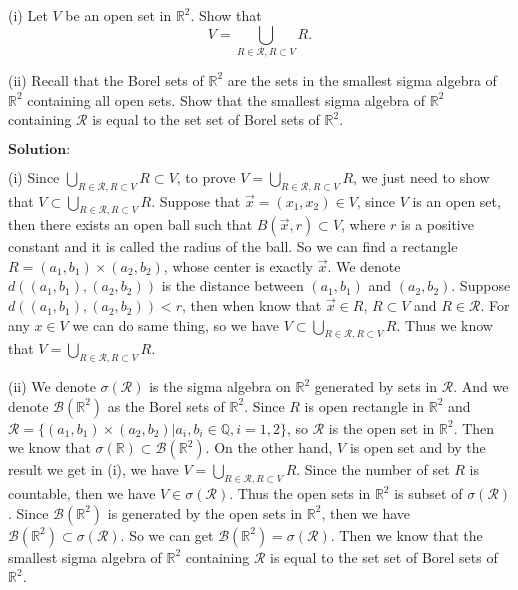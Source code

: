\documentclass[12pt,a4paper]{ctexart}
\begin{document}
(i) Let $V$ be an open set in $\mathbb{R}^{2}$. Show that 
\begin{equation*}
   V = \bigcup_{R \in \mathcal{R}, R \subset V} R.
\end{equation*}

(ii) Recall that the Borel sets of $\mathbb{R}^{2}$ are the sets in the smallest sigma algebra of $\mathbb{R}^{2}$ containing all open sets. Show that the smallest sigma algebra of $\mathbb{R}^{2}$ containing $\mathcal{R}$ is equal to the set set of Borel sets of $\mathbb{R}^{2}$. 

\vspace{8pt}
$\textbf{Solution:}$

(i) Since $\bigcup_{R \in \mathcal{R}, R \subset V} R \subset V$, to prove $V = \bigcup_{R \in \mathcal{R}, R \subset V} R$, we just need to show that $V \subset \bigcup_{R \in \mathcal{R}, R \subset V} R$. Suppose that $\vec{x} = (x_{1}, x_{2}) \in V$, since $V$ is an open set, then there exists an open ball such that $B(\vec{x}, r) \subset V$, where $r$ is a positive constant and it is called the radius of the ball. So we can find a rectangle $ R = (a_{1}, b_{1}) \times (a_{2}, b_{2})$, whose center is exactly $\vec{x}$. We denote $d((a_{1}, b_{1}), (a_{2}, b_{2}))$ is the distance between $(a_{1}, b_{1})$ and $(a_{2}, b_{2})$. Suppose $d((a_{1}, b_{1}), (a_{2}, b_{2})) < r$, then when know that $\vec{x} \in R$, $R \subset V$ and $R \in \mathcal{R}$. For any $x \in V$ we can do same thing, so we have $V \subset \bigcup_{R \in \mathcal{R}, R \subset V} R$. Thus we know that $V = \bigcup_{R \in \mathcal{R}, R \subset V} R$.

(ii) We denote $\sigma(\mathcal{R})$ is the sigma algebra on $\mathbb{R}^{2}$ generated by sets in $\mathcal{R}$. And we denote $\mathcal{B}(\mathbb{R}^{2})$ as the Borel sets of $\mathbb{R}^{2}$. Since $R$ is open rectangle in $\mathbb{R}^{2}$ and $\mathcal{R} = \{(a_{1}, b_{1}) \times (a_{2}, b_{2}) | a_{i}, b_{i} \in \mathbb{Q}, i = 1, 2\}$, so $\mathcal{R}$ is the open set in $\mathbb{R}^{2}$. Then we know that $\sigma(\mathbb{R}) \subset \mathcal{B}(\mathbb{R}^{2})$. On the other hand, $V$ is open set and by the result we get in (i), we have $V = \bigcup_{R \in \mathcal{R}, R \subset V} R$. Since the number of set $R$ is countable, then we have $V \in \sigma(\mathcal{R})$. Thus the open sets in $\mathbb{R}^{2}$ is subset of $\sigma(\mathcal{R})$. Since $\mathcal{B}(\mathbb{R}^{2})$ is generated by the open sets in $\mathbb{R}^{2}$, then we have $\mathcal{B}(\mathbb{R}^{2}) \subset \sigma(\mathcal{R})$. So we can get $\mathcal{B}(\mathbb{R}^{2}) = \sigma(\mathcal{R})$. Then we know that the smallest sigma algebra of $\mathbb{R}^{2}$ containing $\mathcal{R}$ is equal to the set set of Borel sets of $\mathbb{R}^{2}$.
\end{document}
